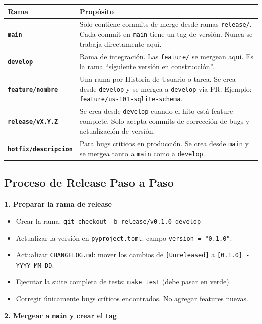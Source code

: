 \documentclass[11pt,a4paper]{article}
\newcommand{\fpath}[1]{\texttt{\small #1}}
\begin{document}
\begin{tabular}{@{}>{\bfseries\small}lp{10cm}@{}}
\toprule
\rowcolor{headergray}
\textbf{Rama} & \textbf{Propósito} \\
\midrule
\fpath{main} & Solo contiene commits de merge desde ramas \fpath{release/}. Cada commit en \fpath{main} tiene un tag de versión. Nunca se trabaja directamente aquí. \\
\rowcolor{headergray}
\fpath{develop} & Rama de integración. Las \fpath{feature/} se mergean aquí. Es la rama ``siguiente versión en construcción''. \\
\fpath{feature/nombre} & Una rama por Historia de Usuario o tarea. Se crea desde \fpath{develop} y se mergea a \fpath{develop} via PR. Ejemplo: \fpath{feature/us-101-sqlite-schema}. \\
\rowcolor{headergray}
\fpath{release/vX.Y.Z} & Se crea desde \fpath{develop} cuando el hito está feature-complete. Solo acepta commits de corrección de bugs y actualización de versión. \\
\fpath{hotfix/descripcion} & Para bugs críticos en producción. Se crea desde \fpath{main} y se mergea tanto a \fpath{main} como a \fpath{develop}. \\
\bottomrule
\end{tabular}

\subsection{Proceso de Release Paso a Paso}

\textbf{1. Preparar la rama de release}

\begin{itemize}[nosep]
  \item Crear la rama: \fpath{git checkout -b release/v0.1.0 develop}
  \item Actualizar la versión en \fpath{pyproject.toml}: campo \fpath{version = "0.1.0"}.
  \item Actualizar \fpath{CHANGELOG.md}: mover los cambios de \fpath{[Unreleased]} a \fpath{[0.1.0] - YYYY-MM-DD}.
  \item Ejecutar la suite completa de tests: \fpath{make test} (debe pasar en verde).
  \item Corregir únicamente bugs críticos encontrados. No agregar features nuevas.
\end{itemize}

\textbf{2. Mergear a \fpath{main} y crear el tag}
\end{document}
